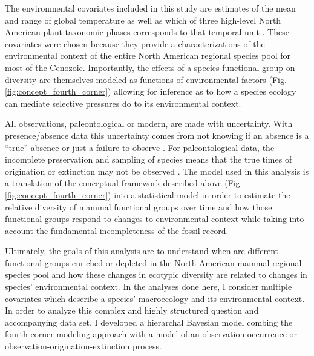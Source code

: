 \documentclass[12pt,letterpaper]{article}
\begin{document}
The environmental covariates included in this study are estimates of the mean and range of global temperature as well as which of three high-level North American plant taxonomic phases corresponds to that temporal unit \citep{Cramer2011,Graham2011a}. These covariates were chosen because they provide a characterizations of the environmental context of the entire North American regional species pool for most of the Cenozoic. Importantly, the effects of a species functional group on diversity are themselves modeled as functions of environmental factors (Fig. \ref{fig:concept_fourth_corner}) allowing for inference as to how a species ecology can mediate selective pressures do to its environmental context. 

All observations, paleontological or modern, are made with uncertainty. With presence/absence data this uncertainty comes from not knowing if an absence is a ``true'' absence or just a failure to observe \citep{Royle2008,Royle2005,Foote1999a,Foote2001,Lloyd2011,Wang2016b}. For paleontological data, the incomplete preservation and sampling of species means that the true times of origination or extinction may not be observed \citep{Foote1999a,Foote2001,Wang2015,Wang2016b}. The model used in this analysis is a translation of the conceptual framework described above (Fig. \ref{fig:concept_fourth_corner}) into a statistical model in order to estimate the relative diversity of mammal functional groups over time and how those functional groups respond to changes to environmental context while taking into account the fundamental incompleteness of the fossil record.

Ultimately, the goals of this analysis are to understand when are different functional groups enriched or depleted in the North American mammal regional species pool and how these changes in ecotypic diversity are related to changes in species' environmental context. In the analyses done here, I consider multiple covariates which describe a species' macroecology and its environmental context. In order to analyze this complex and highly structured question and accompanying data set, I developed a hierarchal Bayesian model combing the fourth-corner modeling approach with a model of an observation-occurrence or observation-origination-extinction process. %
\end{document}
